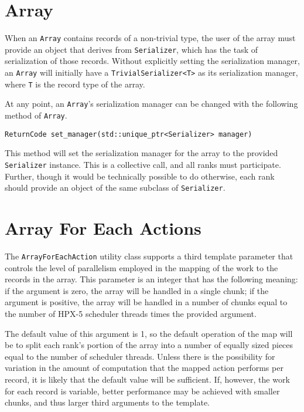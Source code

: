 \section{Array}

When an \texttt{Array} contains records of a non-trivial type, the user of
the array must provide an object that derives from \texttt{Serializer}, which
has the task of serialization of those records. Without explicitly setting the
serialization manager, an \texttt{Array} will initially have a
\texttt{TrivialSerializer<T>} as its serialization manager, where \texttt{T} 
is the record type of the array.

At any point, an \texttt{Array}'s serialization manager can be changed with 
the following method of \texttt{Array}.

\begin{lstlisting}
ReturnCode set_manager(std::unique_ptr<Serializer> manager)
\end{lstlisting} 

\noindent This method will set the serialization manager for the array to the 
provided \texttt{Serializer} instance. This is a collective call, and all ranks
must participate. Further, though it would be technically possible to do 
otherwise, each rank should provide an object of the same subclass of 
\texttt{Serializer}.

\noindent

\section{Array For Each Actions}

The \texttt{ArrayForEachAction} utility class supports a third template
parameter that controls the level of parallelism employed in the mapping of
the work to the records in the array. This parameter is an integer that has the
following meaning: if the argument is zero, the array will be handled in a
single chunk; if the argument is positive, the array will be handled in a
number of chunks equal to the number of HPX-5 scheduler threads times the
provided argument.

The default value of this argument is 1, so the default operation of
the map will be to split each rank's portion of the array into a number of
equally sized pieces equal to the number of scheduler threads. Unless there is
the possibility for variation in the amount of computation that the mapped
action performs per record, it is likely that the default value will be
sufficient. If, however, the work for each record is variable, better
performance may be achieved with smaller chunks, and thus larger third
arguments to the template.


